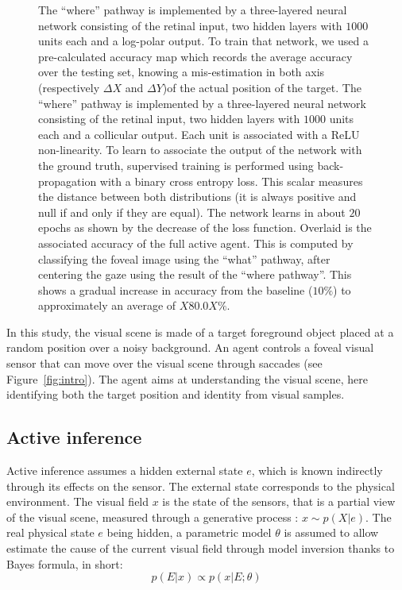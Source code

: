 \begin{figure}[t!]
{\ICANN
\C The ``where'' pathway is implemented by a three-layered neural network consisting of the retinal input, two hidden layers with $1000$ units each and a log-polar output. To train that network, we used a pre-calculated accuracy map which records the average accuracy over the testing set, knowing a mis-estimation in both axis \ICANN
\else (respectively $\Delta X$ and  $\Delta Y$)\fi of the actual position of the target. %
\else
\C The ``where'' pathway is implemented by a three-layered neural network consisting of the retinal input, two hidden layers with $1000$ units each and a collicular output. Each unit is associated with a ReLU non-linearity. To learn to associate the output of the network with the ground truth, supervised training is performed using back-propagation with a binary cross entropy loss. This scalar measures the distance between both distributions (it is always positive and null if and only if they are equal). The network learns in about $20$ epochs as shown by the decrease of the loss function. Overlaid is the associated accuracy of the full active agent. This is computed by classifying the foveal image using the ``what'' pathway, after centering the gaze using the result of the ``where pathway''. This shows a gradual increase in accuracy from the baseline ($10\%$) to approximately an average of $X80.0X\%$. %
\fi
		\label{fig:methods}}%
\end{figure}%
In this study, the visual scene is made of a target foreground object placed at a random position over a noisy background. An agent controls a foveal visual sensor that can move over the visual scene through saccades (see Figure~\ref{fig:intro}).
The agent aims at understanding the visual scene, here identifying both the target position and identity from visual samples.

\subsection{Active inference}
Active inference assumes a hidden external state $e$, which is known indirectly through its effects on the sensor. The external state  corresponds to the physical environment. The visual field $x$ is the state of the sensors, that is a partial view of the visual scene, measured through a generative process : $x\sim p(X|e)$. The real physical state $e$ being hidden, a parametric model $\theta$ is assumed to allow estimate the cause of the current visual field through model inversion thanks to Bayes formula, in short:
$$p(E|x) \propto p(x|E;\theta)$$


